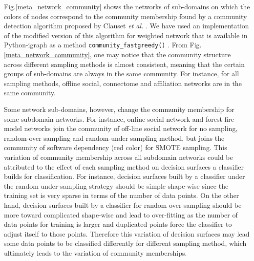 \documentclass[..]{revtex4}
\begin{document}
Fig.\ref{meta_network_community} shows the networks of sub-domains on which the colors of nodes correspond to the community membership found by a community detection algorithm proposed by Clauset \textit{et al.} \cite{CNMAlgorithm}. We have used an implementation of the modified version of this algorithm for weighted network that is available in Python-igraph as a method \texttt{community\_fastgreedy()} \cite{igraph}. From Fig.\ref{meta_network_community}, one may notice that the community structure across different sampling methods is almost consistent, meaning that the certain groups of sub-domains are always in the same community.  For instance, for all sampling methods, offline social, connectome and affiliation networks are in the same community. 

Some network sub-domains, however, change the community membership for some subdomain networks. For instance, online social network and forest fire model networks join the community of off-line social network for no sampling, random-over sampling and random-under sampling method, but joins the community of software dependency (red color) for SMOTE sampling. This variation of community membership across all subdomain networks could be attributed to the effect of each sampling method on decision surfaces a classifier builds for classification. For instance, decision surfaces built by a classifier under the random under-sampling strategy should be simple shape-wise since the training set is very sparse in terms of the number of data points. On the other hand, decision surfaces built by a classifier for random over-sampling should be more toward complicated shape-wise and lead to over-fitting as the number of data points for training is larger and duplicated points force the classifier to adjust itself to those points. Therefore this variation of decision surfaces may lead some data points to be classified differently for different sampling method, which ultimately leads to the variation of community memberships.
\end{document}
